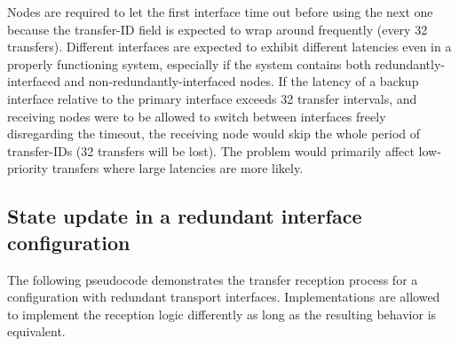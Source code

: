 Nodes are required to let the first interface time out before using the next one because the
transfer-ID field is expected to wrap around frequently (every 32 transfers).
Different interfaces are expected to exhibit different latencies even in a properly functioning system,
especially if the system contains both redundantly-interfaced and non-redundantly-interfaced nodes.
If the latency of a backup interface relative to the primary interface exceeds 32 transfer intervals,
and receiving nodes were to be allowed to switch between interfaces freely disregarding the timeout,
the receiving node would skip the whole period of transfer-IDs (32 transfers will be lost).
The problem would primarily affect low-priority transfers where large latencies are more likely.

\subsection{State update in a redundant interface configuration}
\label{sec:transfer_reception_state_update_redundant}

The following pseudocode demonstrates the transfer reception process
for a configuration with redundant transport interfaces.
Implementations are allowed to implement the reception logic differently as long as the resulting
behavior is equivalent.

